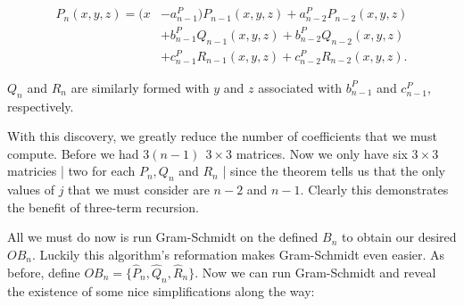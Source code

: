\documentclass[letterpaper, 12pt]{article}
\begin{document}
\vspace*{-12mm}
\begin{align*}
	P_n(x,y,z) = (x&-a_{n-1}^P)P_{n-1}(x,y,z) + a_{n-2}^PP_{n-2}(x,y,z) \\
				&+ b_{n-1}^PQ_{n-1}(x,y,z) + b_{n-2}^PQ_{n-2}(x,y,z) \\
				&+ c_{n-1}^PR_{n-1}(x,y,z) + c_{n-2}^PR_{n-2}(x,y,z).
\end{align*}

\vspace*{-3mm}
\noindent $Q_n$ and $R_n$ are similarly formed with $y$ and $z$ associated with $b_{n-1}^P$ and $c_{n-1}^P$, respectively.

With this discovery, we greatly reduce the number of coefficients that we must compute. Before we had $3(n-1) \ \ 3\times 3$ matrices. Now we only have six $3\times 3$ matricies | two for each $P_n, Q_n$ and $R_n$ | since the theorem tells us that the only values of $j$ that we must consider are $n-2$ and $n-1$. Clearly this demonstrates the benefit of three-term recursion.

All we must do now is run Gram-Schmidt on the defined $B_n$ to obtain our desired $OB_n$. Luckily this algorithm's reformation makes Gram-Schmidt even easier. As before, define $OB_n = \{\hat{P}_n, \hat{Q}_n, \hat{R}_n\}$. Now we can run Gram-Schmidt and reveal the existence of some nice simplifications along the way:
\end{document}

